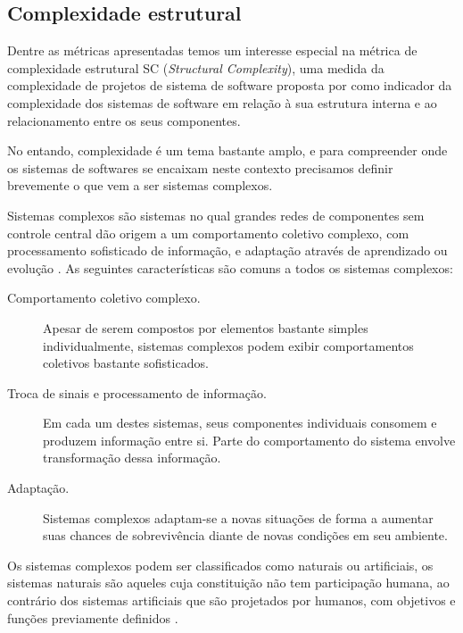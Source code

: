 \subsection{Complexidade estrutural} \label{complexidade}

Dentre as métricas apresentadas temos um interesse especial na métrica de
complexidade estrutural SC ({\it Structural Complexity}), uma medida da
complexidade de projetos de sistema de software proposta por
 como indicador da complexidade dos sistemas de software
em relação à sua estrutura interna e ao relacionamento entre os seus
componentes.

No entando, complexidade é um tema bastante amplo, e para compreender onde os
sistemas de softwares se encaixam neste contexto precisamos definir brevemente
o que vem a ser sistemas complexos.

Sistemas complexos são sistemas no qual grandes redes de componentes sem
controle central dão origem a um comportamento
coletivo complexo, com processamento sofisticado de informação, e adaptação
através de aprendizado ou evolução \cite{Mitchell2009}. As seguintes
características são comuns a todos os sistemas complexos:

\begin{description}

  \item[Comportamento coletivo complexo.] Apesar de serem compostos por
  elementos bastante simples individualmente, sistemas complexos podem exibir
  comportamentos coletivos bastante sofisticados.

  \item[Troca de sinais e processamento de informação.] Em cada um destes
  sistemas, seus componentes individuais consomem e produzem informação entre
  si. Parte do comportamento do sistema envolve transformação dessa informação.

  \item[Adaptação.] Sistemas complexos adaptam-se a novas situações de forma a
  aumentar suas chances de sobrevivência diante de novas condições em seu
  ambiente.

\end{description}

Os sistemas complexos podem ser classificados como naturais ou artificiais, os
sistemas naturais são aqueles cuja constituição não tem participação humana, ao
contrário dos sistemas artificiais que são projetados por humanos, com
objetivos e funções previamente definidos \cite{Simon1996}.

